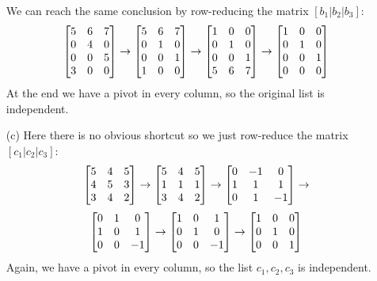 \documentclass[a4paper]{amsart}
\renewenvironment{solution}{\SolutionInline}{\endSolutionInline}
\begin{document}
\begin{solution}
\begin{itemize}
   We can reach the same conclusion by row-reducing the matrix
   $[b_1|b_2|b_3]$: 
   \[ 
     \left[\begin{matrix} 5 & 6 & 7 \\
          0 & 4 & 0 \\
          0 & 0 & 5 \\
          3 & 0 & 0
     \end{matrix}\right] 
     \to
     \left[\begin{matrix} 5 & 6 & 7 \\
          0 & 1 & 0 \\
          0 & 0 & 1 \\
          1 & 0 & 0
     \end{matrix}\right] 
     \to
     \left[\begin{matrix} 1 & 0 & 0 \\
          0 & 1 & 0 \\
          0 & 0 & 1 \\
          5 & 6 & 7
     \end{matrix}\right] 
     \to
     \left[\begin{matrix} 1 & 0 & 0 \\
          0 & 1 & 0 \\
          0 & 0 & 1 \\
          0 & 0 & 0
     \end{matrix}\right] 
   \]
   At the end we have a pivot in every column, so the original list is
   independent.
  \item[(c)] Here there is no obvious shortcut so we just row-reduce
   the matrix $[c_1|c_2|c_3]$:
   \[
    \left[\begin{matrix} 5 & 4 & 5 \\ 
         4 & 5 & 3 \\
         3 & 4 & 2 \end{matrix}\right] 
    \to
    \left[\begin{matrix} 5 & 4 & 5 \\ 
         1 & 1 & 1 \\
         3 & 4 & 2 \end{matrix}\right] 
    \to
    \left[\begin{matrix} 0 &-1 & 0 \\ 
         1 & 1 & 1 \\
         0 & 1 &-1 \end{matrix}\right] 
    \to
   \] \[
    \left[\begin{matrix} 0 & 1 & 0 \\ 
         1 & 0 & 1 \\
         0 & 0 &-1 \end{matrix}\right] 
    \to
    \left[\begin{matrix} 1 & 0 & 1 \\
         0 & 1 & 0 \\ 
         0 & 0 &-1 \end{matrix}\right] 
    \to
    \left[\begin{matrix} 1 & 0 & 0 \\
         0 & 1 & 0 \\ 
         0 & 0 & 1 \end{matrix}\right] 
   \]
   Again, we have a pivot in every column, so the list $c_1,c_2,c_3$ is
   independent.
 \end{itemize}
\end{solution}
\end{document}
